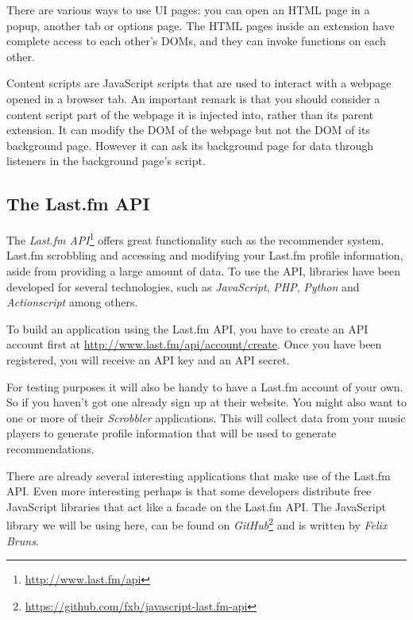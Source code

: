There are various ways to use UI pages: you can open an HTML page in a popup, another tab or options page. The HTML pages inside an extension have complete access to each other's DOMs, and they can invoke functions on each other\cite{google:2012:overview}.

Content scripts are JavaScript scripts that are used to interact with a webpage opened in a browser tab. An important remark is that you should consider a content script part of the webpage it is injected into, rather than its parent extension. It can modify the DOM of the webpage but not the DOM of its background page. However it can ask its background page for data through listeners in the background page's script\cite{google:2012:overview}.



\subsection{The Last.fm API}\label{chapter:implementation:section:technologies:subsection:lastfm}

The \emph{Last.fm API}\footnote{\url{http://www.last.fm/api}} offers great functionality such as the recommender system, Last.fm scrobbling and accessing and modifying your Last.fm profile information, aside from providing a large amount of data. To use the API, libraries have been developed for several technologies, such as \emph{JavaScript}, \emph{PHP}, \emph{Python} and \emph{Actionscript} among others\cite{lastfm:2012:home}.

To build an application using the Last.fm API, you have to create an API account first at \url{http://www.last.fm/api/account/create}. Once you have been registered, you will receive an API key and an API secret.

For testing purposes it will also be handy to have a Last.fm account of your own. So if you haven't got one already sign up at their website. You might also want to one or more of their \emph{Scrobbler} applications. This will collect data from your music players to generate profile information that will be used to generate recommendations\cite{lastfm:2013:scrobbling}.

There are already several interesting applications that make use of the Last.fm API. Even more interesting perhaps is that some developers distribute free JavaScript libraries that act like a facade on the Last.fm API. The JavaScript library we will be using here, can be found on \emph{GitHub}\footnote{\url{https://github.com/fxb/javascript-last.fm-api}} and is written by \emph{Felix Bruns}.


